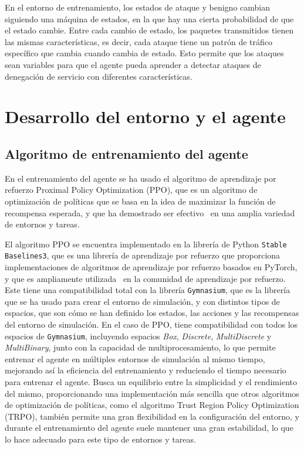 En el entorno de entrenamiento, los estados de ataque y benigno cambian siguiendo una máquina de estados, en la que hay una cierta probabilidad de que el estado cambie. Entre cada cambio de estado, los paquetes transmitidos tienen las mismas características, es decir, cada ataque tiene un patrón de tráfico específico que cambia cuando cambia de estado. Esto permite que los ataques sean variables para que el agente pueda aprender a detectar ataques de denegación de servicio con diferentes características.

\section{Desarrollo del entorno y el agente}

\subsection{Algoritmo de entrenamiento del agente}
En el entrenamiento del agente se ha usado el algoritmo de aprendizaje por refuerzo Proximal Policy Optimization (PPO), que es un algoritmo de optimización de políticas que se basa en la idea de maximizar la función de recompensa esperada, y que ha demostrado ser efectivo~\cite{Siboo2023, Yu2022} en una amplia variedad de entornos y tareas.

El algoritmo PPO se encuentra implementado en la librería de Python \texttt{Stable Baselines3}, que es una librería de aprendizaje por refuerzo que proporciona implementaciones de algoritmos de aprendizaje por refuerzo basados en PyTorch, y que es ampliamente utilizada~\cite{Raffin2021} en la comunidad de aprendizaje por refuerzo.
Este tiene una compatibilidad total con la librería \texttt{Gymnasium}, que es la librería que se ha usado para crear el entorno de simulación, y con distintos tipos de espacios, que son cómo se han definido los estados, las acciones y las recompensas del entorno de simulación. En el caso de PPO, tiene compatibilidad con todos los espacios de \texttt{Gymnasium}, incluyendo espacios \textit{Box}, \textit{Discrete}, \textit{MultiDiscrete} y \textit{MultiBinary}, junto con la capacidad de multiprocesamiento, lo que permite entrenar el agente en múltiples entornos de simulación al mismo tiempo, mejorando así la eficiencia del entrenamiento y reduciendo el tiempo necesario para entrenar el agente.
Busca un equilibrio entre la simplicidad y el rendimiento del mismo, proporcionando una implementación más sencilla que otros algoritmos de optimización de políticas, como el algoritmo Trust Region Policy Optimization (TRPO), también permite una gran flexibilidad en la configuración del entorno, y durante el entrenamiento del agente suele mantener una gran estabilidad, lo que lo hace adecuado para este tipo de entornos y tareas.

